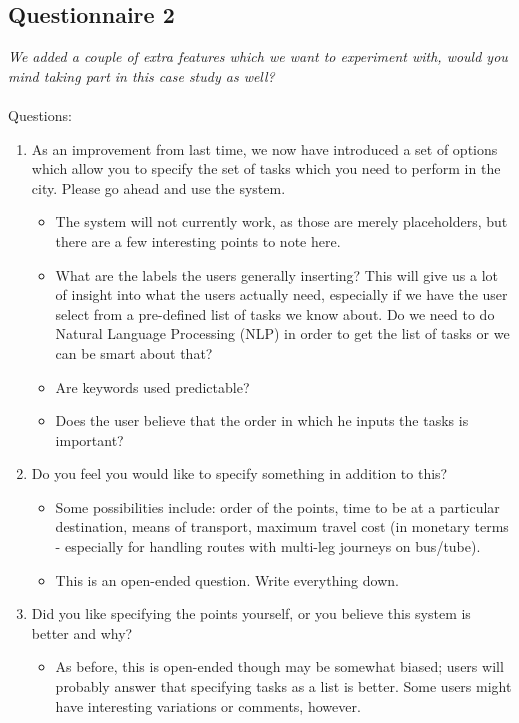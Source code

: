 \documentclass[a4paper, 10pt]{report}
\begin{document}
\begin{appendices}
\subsection*{Questionnaire 2}
\textit{We added a couple of extra features which we want to experiment with, would you mind taking part in this case study as well?} \\\\ Questions:
\begin{enumerate}
\item As an improvement from last time, we now have introduced a set of options which allow you to specify the set of tasks which you need to perform in the city. Please go ahead and use the system. \begin{itemize}
\item The system will not currently work, as those are merely placeholders, but there are a few interesting points to note here.
\item What are the labels the users generally inserting? This will give us a lot of insight into what the users actually need, especially if we have the user select from a pre-defined list of tasks we know about. Do we need to do Natural Language Processing (NLP) in order to get the list of tasks or we can be smart about that? 
\item Are keywords used predictable?
\item Does the user believe that the order in which he inputs the tasks is important?
\end{itemize}
\item Do you feel you would like to specify something in addition to this? \begin{itemize}
\item Some possibilities include: order of the points, time to be at a particular destination, means of transport, maximum travel cost (in monetary terms - especially for handling routes with multi-leg journeys on bus/tube).
\item This is an open-ended question. Write everything down.
\end{itemize}
\item Did you like specifying the points yourself, or you believe this system is better and why?
\begin{itemize}
\item As before, this is open-ended though may be somewhat biased; users will probably answer that specifying tasks as a list is better. Some users might have interesting variations or comments, however.
\end{itemize}
\end{enumerate}


\end{appendices}
\end{document}
